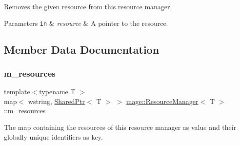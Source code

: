 Removes the given resource from this resource manager.


\begin{DoxyParams}[1]{Parameters}
\mbox{\tt in}  & {\em resource} & A pointer to the resource. \\
\hline
\end{DoxyParams}


\subsection{Member Data Documentation}
\hypertarget{classmage_1_1_resource_manager_a7d5f31a34e76f343988b7d6e9a62a617}{}\label{classmage_1_1_resource_manager_a7d5f31a34e76f343988b7d6e9a62a617} 
\subsubsection{\texorpdfstring{m\+\_\+resources}{m\_resources}}
{\footnotesize\ttfamily template$<$typename T $>$ \\
map$<$ wstring, \hyperlink{namespacemage_a1e01ae66713838a7a67d30e44c67703e}{Shared\+Ptr}$<$ T $>$ $>$ \hyperlink{classmage_1_1_resource_manager}{mage\+::\+Resource\+Manager}$<$ T $>$\+::m\+\_\+resources\hspace{0.3cm}{\ttfamily [private]}}

The map containing the resources of this resource manager as value and their globally unique identifiers as key. 